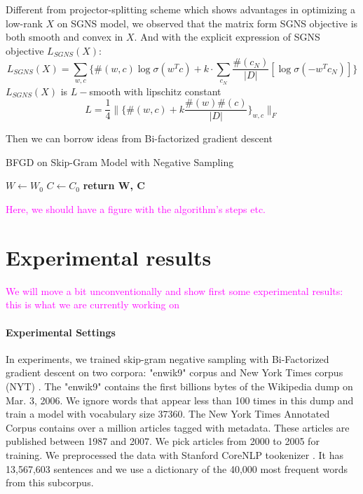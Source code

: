 \documentclass[letterpaper]{article} %
\begin{document}
Different from projector-splitting scheme\cite{fonarev2017riemannian} which shows advantages in optimizing a low-rank $X$ on SGNS model, we observed that the matrix form SGNS objective is both smooth and convex in $X$. And with the explicit expression of SGNS objective $L_{SGNS}(X)$:
\begin{equation}
	L_{SGNS}(X)=\sum_{w,c}\{\#(w,c)\log\sigma(w^Tc)+k\cdot\sum_{c_N}\frac{\#(c_N)}{|D|}[\log \sigma(-w^Tc_N)]\}
\end{equation}
$L_{SGNS}(X)$ is $L-$smooth with lipschitz constant $$L=\frac{1}{4}\|\{\#(w,c)+k\frac{\#(w)\#(c)}{|D|}\}_{w,c}\|_F$$



Then we can borrow ideas from Bi-factorized gradient descent  \cite{park2016finding}

\begin{algorithm}
\caption{BFGD on Skip-Gram Model with Negative Sampling}\label{alg:bfgd}
\begin{algorithmic}[1]
 
\State $W\gets W_0$
\State $C\gets C_0$
\EndFor
\State \textbf{return W, C}
\EndProcedure
\end{algorithmic}
\end{algorithm}

\textcolor{magenta}{Here, we should have a figure with the algorithm's steps etc.}

\section{Experimental results}
\textcolor{magenta}{We will move a bit unconventionally and show first some experimental results: this is what we are currently working on}
\paragraph{Experimental Settings} In experiments, we trained skip-gram negative sampling with Bi-Factorized gradient descent on two corpora:  "enwik9" corpus \cite{mahoney2011large} and New York Times corpus (NYT) \cite{sandhaus2008new}. The "enwik9" contains the first billions bytes of the Wikipedia dump on Mar. 3, 2006. We ignore words that appear less than 100 times in this dump and train a model with vocabulary size 37360. The New York Times Annotated Corpus contains over a million articles tagged with metadata. These articles are published between 1987 and 2007. We pick articles from 2000 to 2005 for training.  We preprocessed the data with Stanford CoreNLP tookenizer \cite{manning2014stanford}. It has 13,567,603 sentences and we use a dictionary of the 40,000 most frequent words from this subcorpus.
\end{document}
